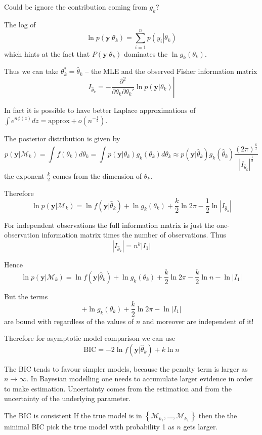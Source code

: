 \documentclass[a4paper]{article}
\newcommand{\obj}[1]{{\left\{ #1 \right \}}}
\newcommand{\brac}[1]{{\left ( #1 \right )}}
\newcommand{\induc}[1]{{\left . #1 \right \vert}}
\newcommand{\abs}[1]{{\left | #1 \right |}}
\newcommand{\Mcal}{\mathcal{M}}
\begin{document}
Could be ignore the contribution coming from $g_k$?

The log of
\[\ln p\brac{\induc{\mathbf{y}}\theta_k} = \sum_{i=1}^n p\brac{\induc{y_i}\theta_k}\]
which hints at the fact that $P\brac{\induc{\mathbf{y}}\theta_k}$ dominates the $\ln g_k(\theta_k)$.

Thus we can take $\theta_k^* = \hat{\theta}_k$ -- the MLE and the observed Fisher information matrix
\[I_{\hat{\theta}_k} = \induc{- \frac{\partial^2}{\partial\theta_k \partial\theta_k'}\ln p\brac{\induc{\mathbf{y}} \theta_k}} \]

In fact it is possible to have better Laplace approximations of $\int e^{n\phi(z)}dz = \text{approx} + o(n^{-\frac{1}{2}})$.

The posterior distribution is given by 
\[p\brac{\induc{\mathbf{y}}\Mcal_k} = \int f(\theta_k) d \theta_k = \int p\brac{\induc{\mathbf{y}}\theta_k} g_k(\theta_k) d \theta_k \approx p\brac{\induc{\mathbf{y}}\hat{\theta}_k} g_k(\hat{\theta}_k) \frac{\brac{2\pi}^\frac{k}{2}}{\abs{I_{\hat{\theta}_k}}^\frac{1}{2}}\]
the exponent $\frac{k}{2}$ comes from the dimension of $\theta_k$.

Therefore
\[\ln p\brac{\induc{\mathbf{y}}\Mcal_k} = \ln f\brac{\induc{\mathbf{y}}\hat{\theta}_k} + \ln g_k(\theta_k) + \frac{k}{2} \ln 2 \pi - \frac{1}{2}\ln \abs{I_{\hat{\theta}_k}} \]

For independent observations the full information matrix is just the one-observation information matrix times the number of observations.
Thus 
\[\abs{I_{\hat{\theta}_k}} = n^k \abs{I_1}\]

Hence 
\[\ln p\brac{\induc{\mathbf{y}}\Mcal_k} = \ln f\brac{\induc{\mathbf{y}}\hat{\theta}_k} + \ln g_k(\theta_k) + \frac{k}{2} \ln 2 \pi - \frac{k}{2}\ln n - \ln \abs{I_1} \]

But the terms 
\[ + \ln g_k(\theta_k) + \frac{k}{2} \ln 2 \pi - \ln \abs{I_1}\]
are bound with regardless of the values of $n$ and moreover are independent of it!

Therefore for asymptotic model comparison we can use
\[\text{BIC} = -2\ln f\brac{\induc{\mathbf{y}}\hat{\theta}_k} + k\ln n \]

The BIC tends to favour simpler models, because the penalty term is larger as $n\to \infty$.
In Bayesian modelling one needs to accumulate larger evidence in order to make estimation.
Uncertainty comes from the estimation and from the uncertainty of the underlying parameter.


The BIC is consistent
If the true model is in $\obj{\Mcal_{k_1},\ldots,\Mcal_{k_L}}$ then the the minimal BIC pick the true model with probability 1 as $n$ gets larger.
\end{document}
